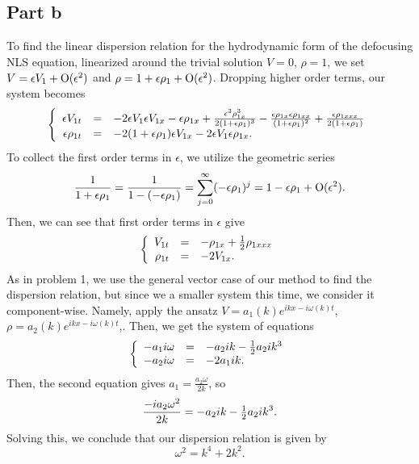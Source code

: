 \documentclass{article}
\begin{document}
\subsection{Part b}
To find the linear dispersion relation for the hydrodynamic form of the defocusing NLS equation, linearized around the trivial solution $V=0$, $\rho=1$, we set $V=\epsilon V_1+\operatorname{O}(\epsilon^2)$ and $\rho=1+\epsilon\rho_1+\operatorname{O}(\epsilon^2)$. Dropping higher order terms, our system becomes
\[
\left\{\begin{array}{rcl}
	\displaystyle \epsilon V_{1t}&=&-2\epsilon V_1\epsilon V_{1x}-\epsilon\rho_{1x}+\frac{\epsilon^3\rho_{1x}^3}{2(1+\epsilon\rho_1)^3}-\frac{\epsilon\rho_{1x}\epsilon\rho_{1xx}}{(1+\epsilon\rho_1)^2}+\frac{\epsilon\rho_{1xxx}}{2(1+\epsilon\rho_1)}\\
	\displaystyle \epsilon\rho_{1t}&=&\displaystyle -2(1+\epsilon\rho_1)\epsilon V_{1x}-2\epsilon V_1\epsilon\rho_{1x}.
\end{array}\right.
\]
To collect the first order terms in $\epsilon$, we utilize the geometric series
\[
\frac{1}{1+\epsilon\rho_1}=\frac{1}{1-(-\epsilon\rho_1)}=\sum_{j=0}^{\infty}(-\epsilon\rho_1)^j=1-\epsilon\rho_1+\operatorname{O}(\epsilon^2).
\]
Then, we can see that first order terms in $\epsilon$ give
\[
\left\{\begin{array}{rcl}
	\displaystyle V_{1t}&=&-\rho_{1x}+\mbox{$\frac{1}{2}$}\rho_{1xxx}\\
	\displaystyle \rho_{1t}&=&\displaystyle -2 V_{1x}.
\end{array}\right.
\]
As in problem 1, we use the general vector case of our method to find the dispersion relation, but since we a smaller system this time, we consider it component-wise. Namely, apply the ansatz  $V=a_1(k)e^{ikx-i\omega(k)t}$, $\rho=a_2(k)e^{ikx-i\omega(k)t}$,. Then, we get the system of equations
\[
\left\{\begin{array}{rcl}
	\displaystyle -a_1i\omega&=&-a_2ik-\mbox{$\frac{1}{2}$} a_2ik^3\\
	\displaystyle -a_2i\omega&=&\displaystyle -2 a_1ik.
\end{array}\right.
\]
Then, the second equation gives $a_1=\frac{a_2\omega}{2k}$, so
\[
\frac{-ia_2\omega^2}{2k}=-a_2ik-\mbox{$\frac{1}{2}$} a_2ik^3.
\]
Solving this, we conclude that our dispersion relation is given by
\[
\omega^2=k^4+2k^2.
\]
\end{document}
